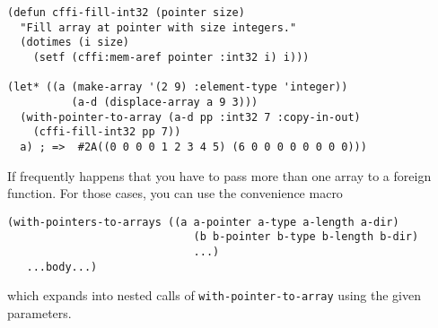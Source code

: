 \documentclass[12pt,a4paper,dvipdfm]{article}
\begin{document}
\begin{lstlisting}
(defun cffi-fill-int32 (pointer size)
  "Fill array at pointer with size integers."
  (dotimes (i size)
    (setf (cffi:mem-aref pointer :int32 i) i)))

(let* ((a (make-array '(2 9) :element-type 'integer))
	      (a-d (displace-array a 9 3)))
  (with-pointer-to-array (a-d pp :int32 7 :copy-in-out)
    (cffi-fill-int32 pp 7))
  a) ; =>  #2A((0 0 0 0 1 2 3 4 5) (6 0 0 0 0 0 0 0 0)))
\end{lstlisting}

If frequently happens that you have to pass more than one array to a
foreign function.  For those cases, you can use the convenience macro

\begin{lstlisting}
(with-pointers-to-arrays ((a a-pointer a-type a-length a-dir)
                             (b b-pointer b-type b-length b-dir)
                             ...)
   ...body...)
\end{lstlisting}
which expands into nested calls of \lstinline!with-pointer-to-array!
using the given parameters.
\end{document}
